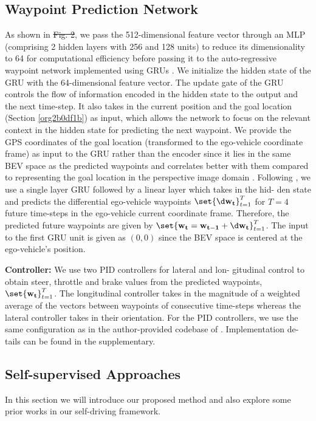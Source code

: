\documentclass[letterpaper, 12pt]{article}
\theoremstyle{definition}
\theoremstyle{definition}
\theoremstyle{definition}
\theoremstyle{definition}
\theoremstyle{definition}
\begin{document}
\subsection{Waypoint Prediction Network \label{org27e88c9}}
\label{sec:org49c1e5b}
As shown in \sout{Fig. 2}, we pass the 512-dimensional feature vector through an MLP
(comprising 2 hidden layers with 256 and 128 units) to reduce its dimensionality
to 64 for computational efficiency before passing it to the auto-regressive
waypoint network implemented using GRUs \cite{Cho2014}. We initialize the hidden
state of the GRU with the 64-dimensional feature vector. The update gate of the
GRU controls the flow of information encoded in the hidden state to the output
and the next time-step. It also takes in the current position and the goal
location (Section \ref{org2b0df1b}) as input, which allows the network to focus
on the relevant context in the hidden state for predicting the next waypoint.
We provide the GPS coordinates of the goal location (transformed to the
ego-vehicle coordinate frame) as input to the GRU rather than the encoder since
it lies in the same BEV space as the predicted waypoints and correlates better
with them compared to representing the goal location in the perspective image
domain \cite{Chen2019}. Following \cite{Filos2020}, we use a single layer GRU
followed by a linear layer which takes in the hid- den state and predicts the
differential ego-vehicle waypoints \(\set{\d \bf w_{t}}_{t=1}^{T}\) for \(T=4\)
future time-steps in the ego-vehicle current coordinate frame. Therefore, the
predicted future waypoints are given by \(\set{\bf w_{t}=\bf w_{t-1} +\d \bf
w_{t}}_{t=1}^{T}\). The input to the first GRU unit is given as \((0,0)\) since
the BEV space is centered at the ego-vehicle’s position.

\textbf{Controller:} We use two PID controllers for lateral and lon- gitudinal control
to obtain steer, throttle and brake values from the predicted waypoints,
\(\set{\bf w_{t}}_{t=1}^{T}\). The longitudinal controller takes in the
magnitude of a weighted average of the vectors between waypoints of consecutive
time-steps whereas the lateral controller takes in their orientation. For the
PID controllers, we use the same configuration as in the author-provided
codebase of \cite{Chen2019}. Implementation de- tails can be found in the supplementary.
\subsection{Self-supervised Approaches}
\label{sec:orge71d24c}
In this section we will introduce our proposed method and also explore some
prior works in our self-driving framework.
\end{document}
